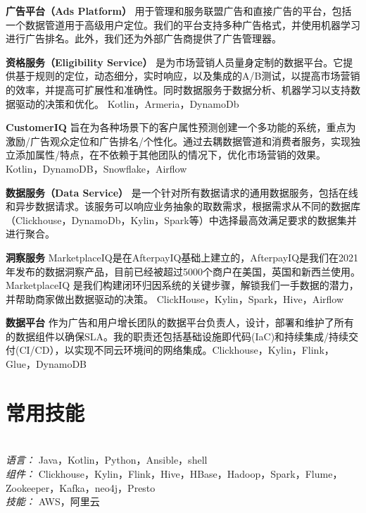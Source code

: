 \documentclass{res}[8.5pt]
\begin{document}
\begin{resume}
\vspace{-25pt}
{\bf 广告平台（Ads Platform）} 用于管理和服务联盟广告和直接广告的平台，包括一个数据管道用于高级用户定位。我们的平台支持多种广告格式，并使用机器学习进行广告排名。此外，我们还为外部广告商提供了广告管理器。

\vspace{-10pt}
{\bf 资格服务（Eligibility Service）} 是为市场营销人员量身定制的数据平台。它提供基于规则的定位，动态细分，实时响应，以及集成的A/B测试，以提高市场营销的效率，并提高可扩展性和准确性。同时数据服务于数据分析、机器学习以支持数据驱动的决策和优化。
Kotlin，Armeria，DynamoDb

\vspace{-10pt}
{\bf CustomerIQ} 旨在为各种场景下的客户属性预测创建一个多功能的系统，重点为激励/广告观众定位和广告排名/个性化。通过去耦数据管道和消费者服务，实现独立添加属性/特点，在不依赖于其他团队的情况下，优化市场营销的效果。
Kotlin，DynamoDB，Snowflake，Airflow

\vspace{-10pt}
{\bf 数据服务（Data Service）} 是一个针对所有数据请求的通用数据服务，包括在线和异步数据请求。该服务可以响应业务抽象的取数需求，根据需求从不同的数据库（Clickhouse，DynamoDb，Kylin，Spark等）中选择最高效满足要求的数据集并进行聚合。

\vspace{-10pt}
{\bf 洞察服务} MarketplaceIQ是在AfterpayIQ基础上建立的，AfterpayIQ是我们在2021年发布的数据洞察产品，目前已经被超过5000个商户在美国，英国和新西兰使用。MarketplaceIQ 是我们构建闭环归因系统的关键步骤，解锁我们一手数据的潜力，并帮助商家做出数据驱动的决策。
ClickHouse，Kylin，Spark，Hive，Airflow

\vspace{-10pt}
{\bf 数据平台} 作为广告和用户增长团队的数据平台负责人，设计，部署和维护了所有的数据组件以确保SLA。我的职责还包括基础设施即代码(IaC)和持续集成/持续交付(CI/CD），以实现不同云环境间的网络集成。Clickhouse，Kylin，Flink，Glue，DynamoDB

\vspace{-10pt}
\section{常用技能}
\vspace{-12pt}
\hrulefill\\
{\sl 语言：}  Java，Kotlin，Python，Ansible，shell\\
{\sl 组件：} Clickhouse，Kylin，Flink，Hive，HBase，Hadoop，Spark，Flume，Zookeeper，Kafka，neo4j，Presto\\
{\sl 技能：} AWS，阿里云


\end{resume}
\end{document}
